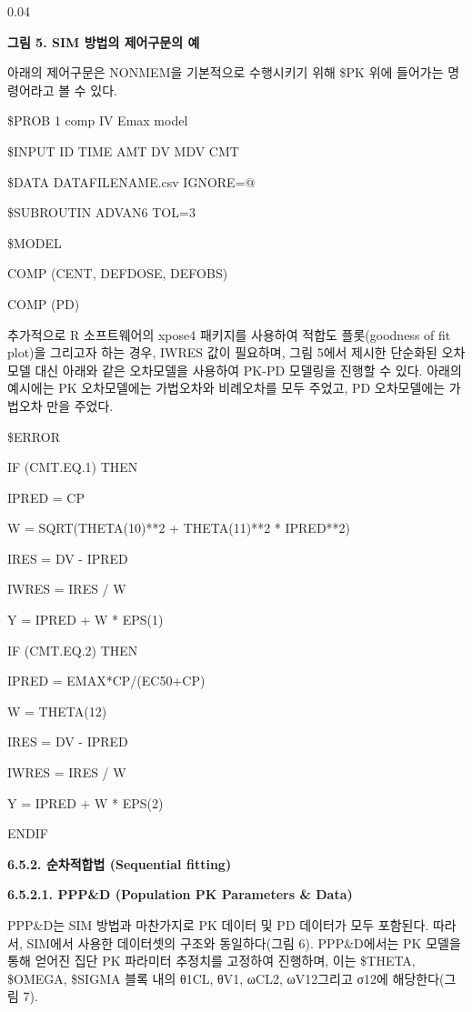 \documentclass[
  10pt,
]{krantz}
\begin{document}
0.04

\textbf{그림 5. SIM 방법의 제어구문의 예}

아래의 제어구문은 NONMEM을 기본적으로 수행시키기 위해 \$PK 위에 들어가는 명령어라고 볼 수 있다.

\$PROB 1 comp IV Emax model

\$INPUT ID TIME AMT DV MDV CMT

\$DATA DATAFILENAME.csv IGNORE=@

\$SUBROUTIN ADVAN6 TOL=3

\$MODEL

COMP (CENT, DEFDOSE, DEFOBS)

COMP (PD)

추가적으로 R 소프트웨어의 xpose4 패키지를 사용하여 적합도 플롯(goodness of fit plot)을 그리고자 하는
경우, IWRES 값이 필요하며, 그림 5에서 제시한 단순화된 오차모델 대신 아래와 같은 오차모델을 사용하여 PK-PD
모델링을 진행할 수 있다. 아래의 예시에는 PK 오차모델에는 가법오차와 비례오차를 모두 주었고, PD 오차모델에는 가법오차
만을 주었다.

\$ERROR

IF (CMT.EQ.1) THEN

IPRED = CP

W = SQRT(THETA(10)**2 + THETA(11)**2 * IPRED**2)

IRES = DV - IPRED

IWRES = IRES / W

Y = IPRED + W * EPS(1)

IF (CMT.EQ.2) THEN

IPRED = EMAX*CP/(EC50+CP)

W = THETA(12)

IRES = DV - IPRED

IWRES = IRES / W

Y = IPRED + W * EPS(2)

ENDIF

\textbf{6.5.2. 순차적합법 (Sequential fitting)}

\textbf{6.5.2.1. PPP\&D (Population PK Parameters \& Data)}

PPP\&D는 SIM 방법과 마찬가지로 PK 데이터 및 PD 데이터가 모두 포함된다. 따라서, SIM에서 사용한 데이터셋의 구조와
동일하다(그림 6). PPP\&D에서는 PK 모델을 통해 얻어진 집단 PK 파라미터 추정치를 고정하여 진행하며, 이는
\$THETA, \$OMEGA, \$SIGMA 블록 내의 θ1CL, θV1,
ωCL2, ωV12그리고
σ12에 해당한다(그림 7).
\end{document}
